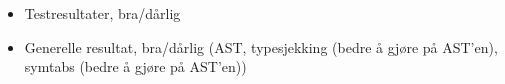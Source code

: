 \begin{itemize}
\item Testresultater, bra/dårlig
\item Generelle resultat, bra/dårlig (AST, typesjekking (bedre å gjøre på AST'en),
symtabs (bedre å gjøre på AST'en))
\end{itemize}